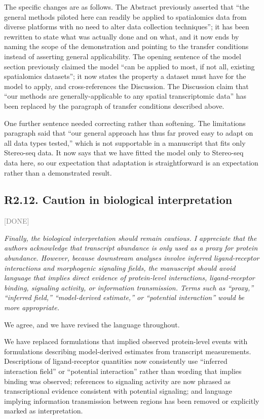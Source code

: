 \documentclass[11pt]{article}
\newcommand{\status}[1]{\textcolor{gray}{\small\textsf{[#1]}}}
\newenvironment{rev}{\begin{leftbar}\itshape\small}{\end{leftbar}}
\begin{document}
The specific changes are as follows. The Abstract previously asserted that ``the general
methods piloted here can readily be applied to spatialomics data from diverse platforms with
no need to alter data collection techniques''; it has been rewritten to state what was
actually done and on what, and it now ends by naming the scope of the demonstration and
pointing to the transfer conditions instead of asserting general applicability. The opening
sentence of the model section previously claimed the model ``can be applied to most, if not
all, existing spatialomics datasets''; it now states the property a dataset must have for
the model to apply, and cross-references the Discussion. The Discussion claim that ``our
methods are generally-applicable to any spatial transcriptomic data'' has been replaced by
the paragraph of transfer conditions described above.

One further sentence needed correcting rather than softening. The limitations paragraph
said that ``our general approach has thus far proved easy to adapt on all data types
tested,'' which is not supportable in a manuscript that fits only Stereo-seq data. It now
says that we have fitted the model only to Stereo-seq data here, so our expectation that
adaptation is straightforward is an expectation rather than a demonstrated result.

\subsection{R2.12. Caution in biological interpretation} \status{DONE}

\begin{rev}
Finally, the biological interpretation should remain cautious. I appreciate that the
authors acknowledge that transcript abundance is only used as a proxy for protein abundance.
However, because downstream analyses involve inferred ligand-receptor interactions and
morphogenic signaling fields, the manuscript should avoid language that implies direct
evidence of protein-level interactions, ligand-receptor binding, signaling activity, or
information transmission. Terms such as ``proxy,'' ``inferred field,'' ``model-derived
estimate,'' or ``potential interaction'' would be more appropriate.
\end{rev}

\noindent We agree, and we have revised the language throughout.

We have replaced formulations that implied observed protein-level events with formulations
describing model-derived estimates from transcript measurements. Descriptions of
ligand-receptor quantities now consistently use ``inferred interaction field'' or
``potential interaction'' rather than wording that implies binding was observed; references
to signaling activity are now phrased as transcriptional evidence consistent with potential
signaling; and language implying information transmission between regions has been removed
or explicitly marked as interpretation.
\end{document}
